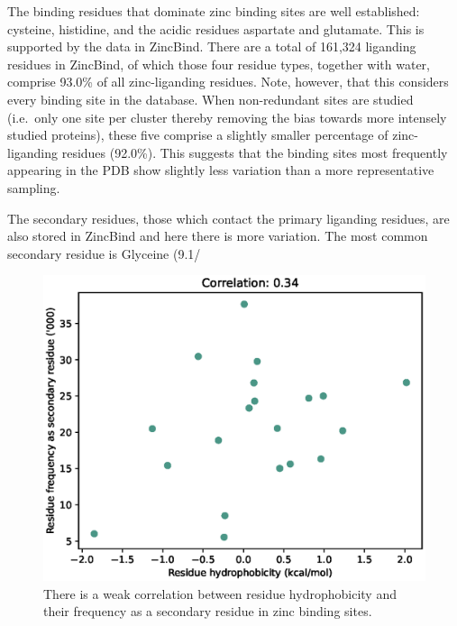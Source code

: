 The binding residues that dominate zinc binding sites are well established: cysteine, histidine, and the acidic residues aspartate and glutamate. This is supported by the data in ZincBind. There are a total of 161,324 liganding residues in ZincBind, of which those four residue types, together with water, comprise 93.0\% of all zinc-liganding residues. Note, however, that this considers every binding site in the database. When non-redundant sites are studied (i.e.\ only one site per cluster thereby removing the bias towards more intensely studied proteins), these five comprise a slightly smaller percentage of zinc-liganding residues (92.0\%). This suggests that the binding sites most frequently appearing in the PDB show slightly less variation than a more representative sampling.

The secondary residues, those which contact the primary liganding residues, are also stored in ZincBind and here there is more variation. The most common secondary residue is Glyceine (9.1/%

\begin{figure}
\centering
\includegraphics[width=1.0\textwidth]{Figures/secondary-residues.eps}
\caption{\label{fig:secondary-residues.eps} There is a weak correlation between residue hydrophobicity and their frequency as a secondary residue in zinc binding sites.}
\end{figure}

